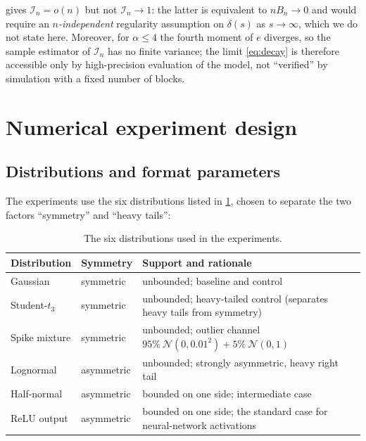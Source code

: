 \documentclass[twocolumn,review,hidelinks,oneeqnum,onetabnum,onefignum,onethmnum]{siamart251216}
\begin{document}
\begin{remark}
 gives $\mathcal I_n=o(n)$ but not $\mathcal I_n\to1$: the latter
is equivalent to $nB_n\to0$ and would require an \emph{$n$-independent}
regularity assumption on $\delta(s)$ as $s\to\infty$, which we do not state here.
Moreover, for $\alpha\le4$ the fourth moment of $e$ diverges, so the sample
estimator of $\mathcal I_n$ has no finite variance; the limit \cref{eq:decay} is
therefore accessible only by high-precision evaluation of the model, not
``verified'' by simulation with a fixed number of blocks.
\end{remark}

\section{Numerical experiment design}
\label{sec:methods}

\subsection{Distributions and format parameters}

The experiments use the six distributions listed in \cref{tab:dists}, chosen to
separate the two factors ``symmetry'' and ``heavy tails'':

\begin{table}[!tb]
\centering
\caption{The six distributions used in the experiments.}
\label{tab:dists}
\small
\begin{tabular}{@{}llp{}@{}}
\toprule
Distribution & Symmetry & Support and rationale \\
\midrule
Gaussian & symmetric & unbounded; baseline and control \\
Student-$t_3$ & symmetric & unbounded; heavy-tailed control (separates heavy tails from symmetry)\\
Spike mixture & symmetric & unbounded; outlier channel $95\%\ \mathcal N(0,0.01^2)+5\%\ \mathcal N(0,1)$ \\
Lognormal & asymmetric & unbounded; strongly asymmetric, heavy right tail \\
Half-normal & asymmetric & bounded on one side; intermediate case \\
ReLU output & asymmetric & bounded on one side; the standard case for neural-network activations \\
\bottomrule
\end{tabular}
\end{table}
\end{document}
